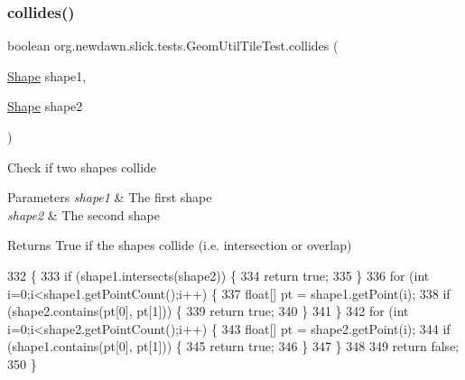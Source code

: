 \subsubsection{\texorpdfstring{collides()}{collides()}}
{\footnotesize\ttfamily boolean org.\+newdawn.\+slick.\+tests.\+Geom\+Util\+Tile\+Test.\+collides (\begin{DoxyParamCaption}\item[{\mbox{\hyperlink{classorg_1_1newdawn_1_1slick_1_1geom_1_1_shape}{Shape}}}]{shape1,  }\item[{\mbox{\hyperlink{classorg_1_1newdawn_1_1slick_1_1geom_1_1_shape}{Shape}}}]{shape2 }\end{DoxyParamCaption})\hspace{0.3cm}{\ttfamily [inline]}}

Check if two shapes collide


\begin{DoxyParams}{Parameters}
{\em shape1} & The first shape \\
\hline
{\em shape2} & The second shape \\
\hline
\end{DoxyParams}
\begin{DoxyReturn}{Returns}
True if the shapes collide (i.\+e. intersection or overlap) 
\end{DoxyReturn}

\begin{DoxyCode}
332                                                         \{
333         \textcolor{keywordflow}{if} (shape1.intersects(shape2)) \{
334             \textcolor{keywordflow}{return} \textcolor{keyword}{true};
335         \}
336         \textcolor{keywordflow}{for} (\textcolor{keywordtype}{int} i=0;i<shape1.getPointCount();i++) \{
337             \textcolor{keywordtype}{float}[] pt = shape1.getPoint(i);
338             \textcolor{keywordflow}{if} (shape2.contains(pt[0], pt[1])) \{
339                 \textcolor{keywordflow}{return} \textcolor{keyword}{true};
340             \}
341         \}
342         \textcolor{keywordflow}{for} (\textcolor{keywordtype}{int} i=0;i<shape2.getPointCount();i++) \{
343             \textcolor{keywordtype}{float}[] pt = shape2.getPoint(i);
344             \textcolor{keywordflow}{if} (shape1.contains(pt[0], pt[1])) \{
345                 \textcolor{keywordflow}{return} \textcolor{keyword}{true};
346             \}
347         \}
348         
349         \textcolor{keywordflow}{return} \textcolor{keyword}{false};
350     \}
\end{DoxyCode}
\mbox{\label{classorg_1_1newdawn_1_1slick_1_1tests_1_1_geom_util_tile_test_a41d402067bc3c606e6b2dbdac3f12ebb}} 
